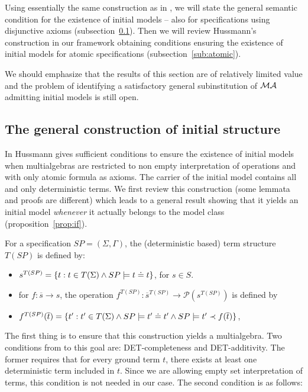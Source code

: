 \documentclass[10pt]{article}
\begin{document}
Using essentially the same construction as in \cite{hussmann}, we will state
the general semantic condition for the existence of initial models -- also for
specifications using disjunctive axioms (subsection~\ref{sub:if}). 
Then we will review Hussmann's construction in our framework
obtaining conditions ensuring the existence of initial models for atomic
specifications (subsection~\ref{sub:atomic}).

We should emphasize that the results of this section are of relatively
limited value and the problem of identifying a satisfactory general subinstitution of
${\mathcal{MA}}$ admitting initial models is still open.

\subsection{The general construction of initial structure}\label{sub:if}
In \cite{hussmann} Hussmann gives sufficient conditions to ensure the
existence of initial models when multialgebras are restricted
to non empty interpretation of operations and with only atomic formula as
axioms. The carrier of the initial model contains all and only deterministic
terms. We first review this construction (some lemmata and proofs are
different) which leads to a general result
showing that it yields an initial model {\em whenever} it actually belongs to the model class
(proposition~\ref{prop:if}).

\begin{definition}\label{de:tsp} \cite{hussmann}
For a specification $SP=(\Sigma,\Gamma)$, the (deterministic based) term
structure $T(SP)$ is defined by:
\begin{itemize}
\item $s^{T(SP)} = \{ t : t \in T(\Sigma) \land SP \models t \mathrel{\dot{=} } t \}$, for $s \in S$.
\item for $f:\overline{s} \to s$, the operation
$f^{T(SP)}:\overline{s}^{T(SP)}\to\mathcal P(s^{T(SP)})$ is defined by
	\item[{}] $f^{T(SP)}(\overline{t})= \{ t': t' \in T(\Sigma) \land SP \models t' \mathrel{\dot{=} } t' \land SP \models t' \prec f(\overline{t}) \}$, 
	\end{itemize}
\end{definition}
%
The first thing is to ensure that this construction yields a multialgebra.
Two conditions from \cite{hussmann} to this goal
are: DET-completeness and DET-additivity. The former requires that for every
ground term $t$, there  exists at least one deterministic term included in
$t$. Since we are allowing empty set interpretation of terms, this condition
is not needed in our case. The second condition is as follows:
\end{document}
